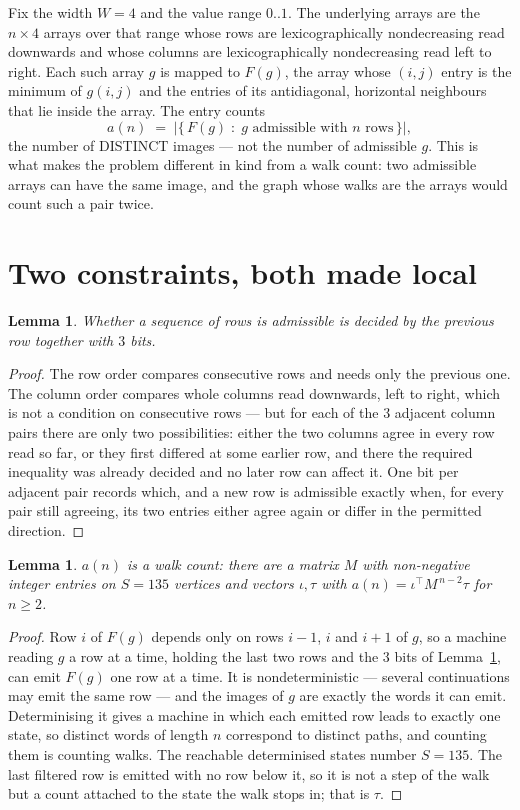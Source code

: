\documentclass[11pt,a4paper]{article}
\theoremstyle{plain}
\newtheorem{lemma}[theorem]{Lemma}
\theoremstyle{definition}
\begin{document}
Fix the width $W=4$ and the value range $0..1$. The underlying arrays are the
$n\times4$ arrays over that range whose rows are lexicographically nondecreasing read downwards
and whose columns are lexicographically nondecreasing read left to right. Each such array $g$
is mapped to $F(g)$, the array whose $(i,j)$ entry is the minimum of $g(i,j)$ and the entries
of its antidiagonal, horizontal neighbours that lie inside the array. The entry counts
\[
a(n)\;=\;\bigl|\{\,F(g)\;:\;g\text{ admissible with }n\text{ rows}\,\}\bigr|,
\]
the number of DISTINCT images --- not the number of admissible $g$. This is what makes the
problem different in kind from a walk count: two admissible arrays can have the same image, and
the graph whose walks are the arrays would count such a pair twice.

\section{Two constraints, both made local}

\begin{lemma}\label{lem:local}
Whether a sequence of rows is admissible is decided by the previous row together with
$3$ bits.
\end{lemma}

\begin{proof}
The row order compares consecutive rows and needs only the previous one. The column order
compares whole columns read downwards, left to right, which is not a condition on consecutive
rows --- but for each of the $3$ adjacent column pairs there are only two possibilities:
either the two columns agree in every row read so far, or they first differed at some earlier
row, and there the required inequality was already decided and no later row can affect it. One
bit per adjacent pair records which, and a new row is admissible exactly when, for every pair
still agreeing, its two entries either agree again or differ in the permitted direction.
\end{proof}

\begin{lemma}\label{lem:det}
$a(n)$ is a walk count: there are a matrix $M$ with non-negative integer entries on $S=135$
vertices and vectors $\iota,\tau$ with $a(n)=\iota^{\!\top}M^{\,n-2}\tau$ for $n\ge2$.
\end{lemma}

\begin{proof}
Row $i$ of $F(g)$ depends only on rows $i-1$, $i$ and $i+1$ of $g$, so a machine reading $g$ a
row at a time, holding the last two rows and the $3$ bits of Lemma~\ref{lem:local}, can
emit $F(g)$ one row at a time. It is nondeterministic --- several continuations may emit the
same row --- and the images of $g$ are exactly the words it can emit. Determinising it gives a
machine in which each emitted row leads to exactly one state, so distinct words of length $n$
correspond to distinct paths, and counting them is counting walks. The reachable determinised
states number $S=135$. The last filtered row is emitted with no row below it, so it is not a
step of the walk but a count attached to the state the walk stops in; that is $\tau$.
\end{proof}
\end{document}
